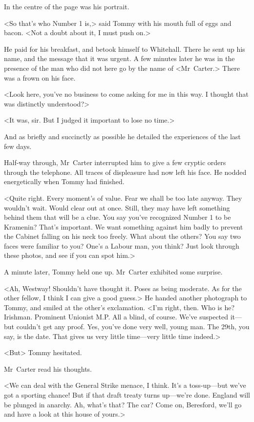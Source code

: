 In the centre of the page was his portrait.

<So that's who Number 1 is,> said Tommy with his mouth full of eggs and bacon. <Not a doubt about it, I must push on.>

He paid for his breakfast, and betook himself to Whitehall. There he sent up his name, and the message that it was urgent. A few minutes later he was in the presence of the man who did not here go by the name of <Mr~Carter.> There was a frown on his face.

<Look here, you've no business to come asking for me in this way. I thought that was distinctly understood?>

<It was, sir. But I judged it important to lose no time.>

And as briefly and succinctly as possible he detailed the experiences of the last few days.

Half-way through, Mr~Carter interrupted him to give a few cryptic orders through the telephone. All traces of displeasure had now left his face. He nodded energetically when Tommy had finished.

<Quite right. Every moment's of value. Fear we shall be too late anyway. They wouldn't wait. Would clear out at once. Still, they may have left something behind them that will be a clue. You say you've recognized Number 1 to be Kramenin? That's important. We want something against him badly to prevent the Cabinet falling on his neck too freely. What about the others? You say two faces were familiar to you? One's a Labour man, you think? Just look through these photos, and see if you can spot him.>

A minute later, Tommy held one up. Mr~Carter exhibited some surprise.

<Ah, Westway! Shouldn't have thought it. Poses as being moderate. As for the other fellow, I think I can give a good guess.> He handed another photograph to Tommy, and smiled at the other's exclamation. <I'm right, then. Who is he? Irishman. Prominent Unionist M.P. All a blind, of course. We've suspected it—but couldn't get any proof. Yes, you've done very well, young man. The 29th, you say, is the date. That gives us very little time—very little time indeed.>

<But\longdash> Tommy hesitated.

Mr~Carter read his thoughts.

<We can deal with the General Strike menace, I think. It's a toss-up—but we've got a sporting chance! But if that draft treaty turns up—we're done. England will be plunged in anarchy. Ah, what's that? The car? Come on, Beresford, we'll go and have a look at this house of yours.>

